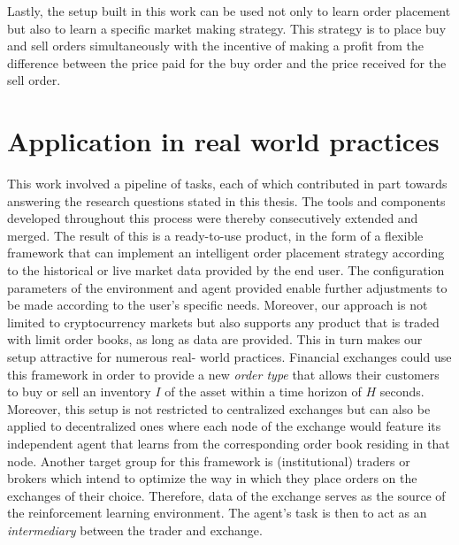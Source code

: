 Lastly, the setup built in this work can be used not only to learn order placement but also to learn a specific market making\cite{o1986microeconomics} strategy.
This strategy is to place buy and sell orders simultaneously with the incentive of making a profit from the difference between the price paid for the buy order and the price received for the sell order.

\section{Application in real world practices}

This work involved a pipeline of tasks, each of which contributed in part towards answering the research questions stated in this thesis.
The tools and components developed throughout this process were thereby consecutively extended and merged.
The result of this is a ready-to-use product, in the form of a flexible framework that can implement an intelligent order placement strategy according to the historical or live market data provided by the end user.
The configuration parameters of the environment and agent provided enable further adjustments to be made according to the user's specific needs.
Moreover, our approach is not limited to cryptocurrency markets but also supports any product that is traded with limit order books, as long as data are provided.
This in turn makes our setup attractive for numerous real- world practices.
Financial exchanges could use this framework in order to provide a new \textit{order type} that allows their customers to buy or sell an inventory $I$ of the asset within a time horizon of $H$ seconds.
Moreover, this setup is not restricted to centralized exchanges but can also be applied to decentralized ones where each node of the exchange would feature its independent agent that learns from the corresponding order book residing in that node.
Another target group for this framework is (institutional) traders or brokers which intend to optimize the way in which they place orders on the exchanges of their choice.
Therefore, data of the exchange serves as the source of the reinforcement learning environment. 
The agent's task is then to act as an \textit{intermediary} between the trader and exchange.